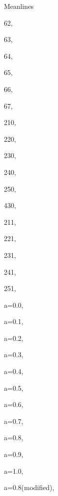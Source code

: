 \documentclass[11pt]{book}
\begin{document}
\begin{theindex}
Meanlines
 \item 62, \hyperref[ml62]{\pageref{ml62}}
 \item 63, \hyperref[ml63]{\pageref{ml63}}
 \item 64, \hyperref[ml64]{\pageref{ml64}}
 \item 65, \hyperref[ml65]{\pageref{ml65}}
 \item 66, \hyperref[ml66]{\pageref{ml66}}
 \item 67, \hyperref[ml67]{\pageref{ml67}}
 \item 210, \hyperref[ml210]{\pageref{ml210}}
 \item 220, \hyperref[ml220]{\pageref{ml220}}
 \item 230, \hyperref[ml230]{\pageref{ml230}}
 \item 240, \hyperref[ml240]{\pageref{ml240}}
 \item 250, \hyperref[ml250]{\pageref{ml250}}
 \item 430, \hyperref[ml430]{\pageref{ml430}}
 \item 211, \hyperref[ml211]{\pageref{ml211}}
 \item 221, \hyperref[ml221]{\pageref{ml221}}
 \item 231, \hyperref[ml231]{\pageref{ml231}}
 \item 241, \hyperref[ml241]{\pageref{ml241}}
 \item 251, \hyperref[ml251]{\pageref{ml251}}
 \item a=0.0, \hyperref[mla=0.0]{\pageref{mla=0.0}}
 \item a=0.1, \hyperref[mla=0.1]{\pageref{mla=0.1}}
 \item a=0.2, \hyperref[mla=0.2]{\pageref{mla=0.2}}
 \item a=0.3, \hyperref[mla=0.3]{\pageref{mla=0.3}}
 \item a=0.4, \hyperref[mla=0.4]{\pageref{mla=0.4}}
 \item a=0.5, \hyperref[mla=0.5]{\pageref{mla=0.5}}
 \item a=0.6, \hyperref[mla=0.6]{\pageref{mla=0.6}}
 \item a=0.7, \hyperref[mla=0.7]{\pageref{mla=0.7}}
 \item a=0.8, \hyperref[mla=0.8]{\pageref{mla=0.8}}
 \item a=0.9, \hyperref[mla=0.9]{\pageref{mla=0.9}}
 \item a=1.0, \hyperref[mla=1.0]{\pageref{mla=1.0}}
 \item a=0.8(modified), \hyperref[mla=0.8(modified)]{\pageref{mla=0.8(modified)}}


\end{theindex}
\end{document}
